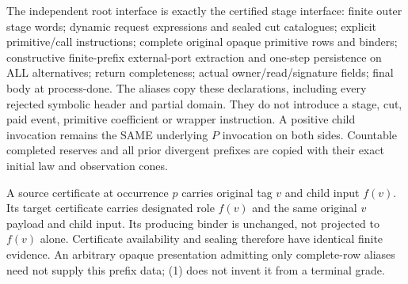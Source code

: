 \documentclass[11pt]{article}
\begin{document}
The independent root interface is exactly the certified stage interface: finite outer stage words; dynamic request expressions and sealed cut catalogues; explicit primitive/call instructions; complete original opaque primitive rows and binders; constructive finite-prefix external-port extraction and one-step persistence on ALL alternatives; return completeness; actual owner/read/signature fields; final body at process-done. The aliases copy these declarations, including every rejected symbolic header and partial domain. They do not introduce a stage, cut, paid event, primitive coefficient or wrapper instruction. A positive child invocation remains the SAME underlying $P$ invocation on both sides. Countable completed reserves and all prior divergent prefixes are copied with their exact initial law and observation cones.

A source certificate at occurrence $p$ carries original tag $v$ and child input $f(v)$. Its target certificate carries designated role $f(v)$ and the same original $v$ payload and child input. Its producing binder is unchanged, not projected to $f(v)$ alone. Certificate availability and sealing therefore have identical finite evidence. An arbitrary opaque presentation admitting only complete-row aliases need not supply this prefix data; (1) does not invent it from a terminal grade.
\end{document}
